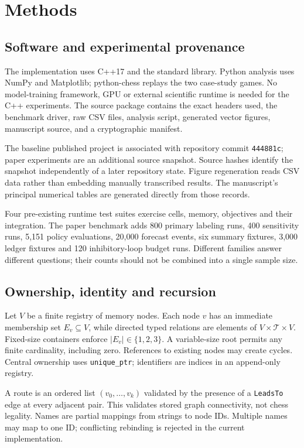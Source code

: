 \documentclass[10pt,a4paper]{article}
\begin{document}
\section*{Methods}
\subsection*{Software and experimental provenance}
The implementation uses C++17 and the standard library. Python analysis uses NumPy and Matplotlib; python-chess replays the two case-study games. No model-training framework, GPU or external scientific runtime is needed for the C++ experiments. The source package contains the exact headers used, the benchmark driver, raw CSV files, analysis script, generated vector figures, manuscript source, and a cryptographic manifest.

The baseline published project is associated with repository commit \texttt{444881c}; paper experiments are an additional source snapshot. Source hashes identify the snapshot independently of a later repository state. Figure regeneration reads CSV data rather than embedding manually transcribed results. The manuscript's principal numerical tables are generated directly from those records.

Four pre-existing runtime test suites exercise cells, memory, objectives and their integration. The paper benchmark adds 800 primary labeling runs, 400 sensitivity runs, 5,151 policy evaluations, 20,000 forecast events, six summary fixtures, 3,000 ledger fixtures and 120 inhibitory-loop budget runs. Different families answer different questions; their counts should not be combined into a single sample size.

\subsection*{Ownership, identity and recursion}
Let $V$ be a finite registry of memory nodes. Each node $v$ has an immediate membership set $E_v\subseteq V$, while directed typed relations are elements of $V\times\mathcal{T}\times V$. Fixed-size containers enforce $|E_v|\in\{1,2,3\}$. A variable-size root permits any finite cardinality, including zero. References to existing nodes may create cycles. Central ownership uses \texttt{unique\_ptr}; identifiers are indices in an append-only registry.

A route is an ordered list $(v_0,\ldots,v_k)$ validated by the presence of a \texttt{LeadsTo} edge at every adjacent pair. This validates stored graph connectivity, not chess legality. Names are partial mappings from strings to node IDs. Multiple names may map to one ID; conflicting rebinding is rejected in the current implementation.
\end{document}

